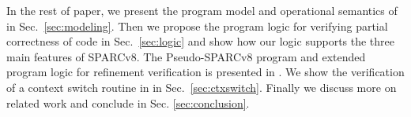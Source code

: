 In the rest of paper,
we present the program model
and operational semantics of \sparc{} in Sec.~\ref{sec:modeling}.
Then we propose the program logic for verifying 
partial correctness of \sparc{} code in Sec.~\ref{sec:logic} and show 
how our logic supports the three main features of SPARCv8.
The Pseudo-SPARCv8 program and extended 
program logic for refinement verification is 
presented in \Sec{\ref{sec:refine-verification-sparc}}. 
We show the verification of a context switch routine 
in \sparc{} in Sec.~\ref{sec:ctxswitch}. 
Finally we discuss more on
related work and conclude in Sec. \ref{sec:conclusion}.

